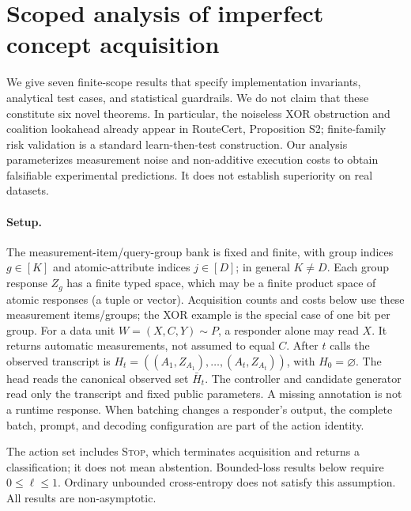 \providecommand{\acamE}{\mathbb{E}}
\providecommand{\acamP}{\mathbb{P}}
\newtheorem{acamprop}{Proposition}

\section{Scoped analysis of imperfect concept acquisition}
\label{app:acam-theory}

We give seven finite-scope results that specify implementation invariants,
analytical test cases, and statistical guardrails. We do not claim that
these constitute six novel theorems. In particular, the noiseless XOR
obstruction and coalition lookahead already appear in RouteCert,
Proposition S2; finite-family risk validation is a standard
learn-then-test construction. Our analysis parameterizes measurement
noise and non-additive execution costs to obtain falsifiable experimental
predictions. It does not establish superiority on real datasets.

\paragraph{Setup.}
The measurement-item/query-group bank is fixed and finite, with group
indices $g\in[K]$ and atomic-attribute indices $j\in[D]$; in general
$K\neq D$. Each group response $Z_g$ has a finite typed space, which may
be a finite product space of atomic responses (a tuple or vector).
Acquisition counts and costs below use these measurement items/groups;
the XOR example is the special case of one bit per group.
For a data unit $W=(X,C,Y)\sim P$, a responder alone may
read $X$. It returns automatic measurements, not assumed to equal $C$.
After $t$ calls the observed transcript is
$H_t=((A_1,Z_{A_1}),\ldots,(A_t,Z_{A_t}))$, with
$H_0=\varnothing$. The head reads the canonical observed set $\bar H_t$.
The controller and candidate generator read only the transcript and
fixed public parameters. A missing annotation is not a runtime response.
When batching changes a responder's output, the complete batch, prompt,
and decoding configuration are part of the action identity.

The action set includes \textnormal{\textsc{Stop}}, which terminates acquisition and
returns a classification; it does not mean abstention. Bounded-loss
results below require $0\leq\ell\leq1$. Ordinary unbounded cross-entropy
does not satisfy this assumption. All results are non-asymptotic.

